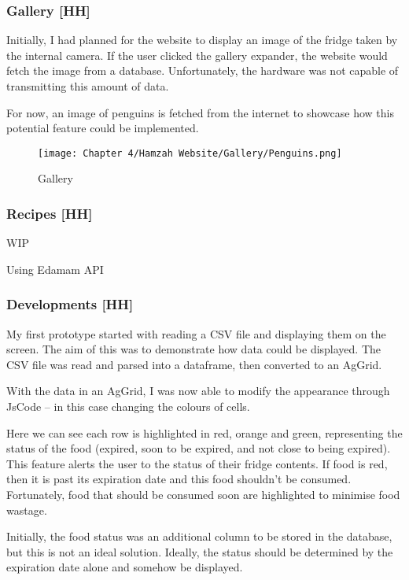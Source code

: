 \subsubsection{Gallery [HH]}

Initially, I had planned for the website to display an image of the fridge taken by the internal camera.
If the user clicked the gallery expander, the website would fetch the image from a database.
Unfortunately, the hardware was not capable of transmitting this amount of data.

For now, an image of penguins is fetched from the internet to showcase how this potential feature could be implemented.

\begin{figure}[H]        
    \centering
    \texttt{[image: Chapter 4/Hamzah Website/Gallery/Penguins.png]}
    \caption{Gallery}
    \label{fig:gallery}
\end{figure} 

\subsubsection{Recipes [HH]}

WIP

Using Edamam API



\subsubsection{Developments [HH]}

My first prototype started with reading a CSV file and displaying them on the screen.
The aim of this was to demonstrate how data could be displayed.
The CSV file was read and parsed into a dataframe, then converted to an AgGrid.

With the data in an AgGrid, I was now able to modify the appearance through JsCode – in this case changing the colours of cells.

Here we can see each row is highlighted in red, orange and green, representing the status of the food (expired, soon to be expired, and not close to being expired).
This feature alerts the user to the status of their fridge contents.
If food is red, then it is past its expiration date and this food shouldn't be consumed.
Fortunately, food that should be consumed soon are highlighted to minimise food wastage.

Initially, the food status was an additional column to be stored in the database, but this is not an ideal solution.
Ideally, the status should be determined by the expiration date alone and somehow be displayed.

